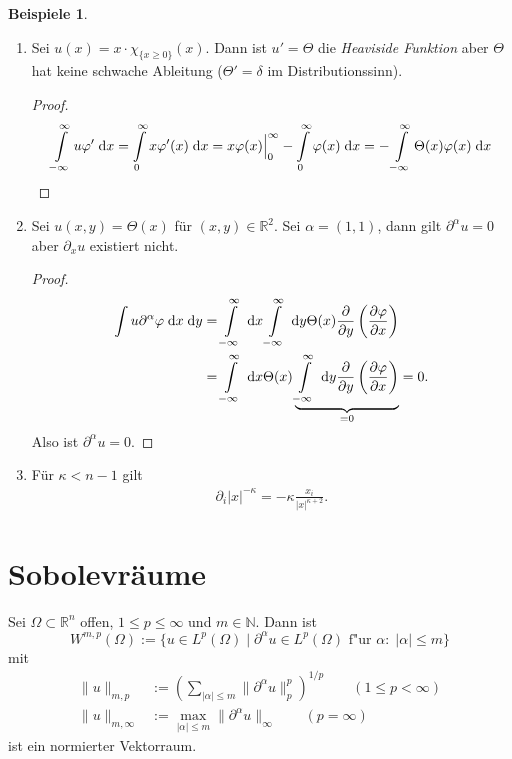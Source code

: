 \documentclass[
paper=a4,
bibtotocnumbered,
liststotocnumbered,
tablecaptionabove,
pointlessnumbers,
twoside,
openright,
10pt
]
{report}
\let\phi\varphi
\theoremstyle{definition}
\newtheorem*{bspe}{Beispiele}
\numberwithin{equation}{chapter}
\begin{document}
\begin{bspe}
\begin{enumerate}[\bf 1)]
\item Sei $u(x)=x\cdot \chi_{\{x\geq 0\}}(x)$. Dann ist $u'=\Theta$ die \textit{Heaviside Funktion} aber $\Theta$ hat keine schwache Ableitung ($\Theta '=\delta$ im Distributionssinn).
\begin{proof}
\begin{align}
\int\limits_{-\infty}^\infty u\phi' \d x=\int\limits_0^\infty x\phi'(x)\d x= x\phi(x)\Big|_0^\infty -\int\limits_0^\infty \phi(x)\d x =-\int\limits_{-\infty}^\infty \Theta(x)\phi(x)\d x
\end{align}
\end{proof}
\item Sei $u(x,y)=\Theta(x)$ für $(x,y)\in\mathbb{R}^2$. Sei $\alpha=(1,1)$, dann gilt $\partial^\alpha u=0$ aber $\partial_x u$ existiert nicht.
\begin{proof}
\begin{align}
\int u\partial^\alpha \phi \d x\d y 
&= \int\limits_{-\infty}^\infty\d x \int\limits_{-\infty}^\infty\d y\Theta(x) \frac{\partial}{\partial y}\left(\frac{\partial\phi}{\partial x}\right)\\
&= \int\limits_{-\infty}^\infty \d x\Theta(x) \underbrace{\int\limits_{-\infty}^\infty\d y \frac{\partial}{\partial y}\left(\frac{\partial\phi}{\partial x}\right)}_{=0} =0.
\end{align}
Also ist $\partial^\alpha u =0$.
\end{proof}
\item Für $\kappa<n-1$ gilt
\begin{align}
\partial_i |x|^{-\kappa} =-\kappa \frac{x_i}{|x|^{\kappa +2}}.
\end{align}
\end{enumerate}
\end{bspe}

\section*{Sobolevräume}
Sei $\Omega\subset\mathbb{R}^n$ offen, $1\leq p\leq\infty$ und $m\in\mathbb{N}$. Dann ist
\begin{equation}
W^{m,p}(\Omega):=\{u\in L^p(\Omega)\mid \partial^\alpha u\in L^p(\Omega)\text{ f"ur }\alpha:\;|\alpha|\leq m\}
\end{equation}
mit
\begin{align}
\|u\|_{m,p}&:=\left(\sum\limits_{|\alpha|\leq m}\|\partial^\alpha u\|_p^p\right)^{1/p}\qquad (1\leq p<\infty) \\
\|u\|_{m,\infty} &:= \max\limits_{|\alpha|\leq m} \|\partial^\alpha u\|_\infty \qquad (p=\infty)
\end{align}
ist ein normierter Vektorraum.
\end{document}
